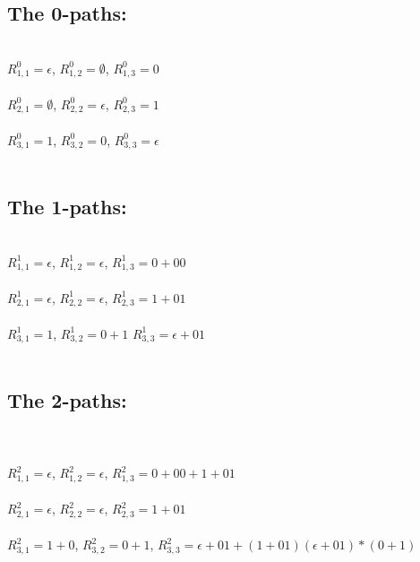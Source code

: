 \documentclass{article}%
\begin{document}
\subsection{The 0-paths:}\\
$R_{1,1}^0 = \epsilon$,
$R_{1,2}^0 = \emptyset$,
$R_{1,3}^0 = 0$\\
\\
$R_{2,1}^0 = \emptyset$,
$R_{2,2}^0 = \epsilon$,
$R_{2,3}^0 = 1$\\
\\
$R_{3,1}^0 = 1$,
$R_{3,2}^0 = 0$,
$R_{3,3}^0 = \epsilon$\\
\\
\subsection{The 1-paths:}\\
$R_{1,1}^1 = \epsilon$,
$R_{1,2}^1 = \epsilon$,
$R_{1,3}^1 = 0 + 00$\\
\\
$R_{2,1}^1 = \epsilon$,
$R_{2,2}^1 = \epsilon$,
$R_{2,3}^1 = 1 + 01$\\
\\
$R_{3,1}^1 = 1$,
$R_{3,2}^1 = 0 + 1$
$R_{3,3}^1 = \epsilon + 01$\\
\\
\subsection{The 2-paths:}\\
\\
$R_{1,1}^2 = \epsilon$,
$R_{1,2}^2 = \epsilon$,
$R_{1,3}^2 = 0 + 00 + 1+01$\\
\\
$R_{2,1}^2 = \epsilon$,
$R_{2,2}^2 = \epsilon$,
$R_{2,3}^2 = 1 + 01$\\
\\
$R_{3,1}^2 = 1 + 0$,
$R_{3,2}^2 = 0 + 1$,
$R_{3,3}^2 = \epsilon + 01 + (1 + 01)(\epsilon + 01)*(0 + 1)$\\
\\
\end{document}
